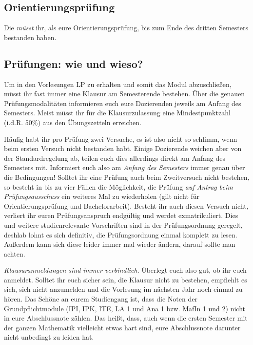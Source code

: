 \subsection{Orientierungsprüfung}

Die  \emph{müsst} ihr, als eure Orientierungsprüfung, bis zum Ende des dritten Semesters bestanden haben.


\subsection{Prüfungen: wie und wieso?}

Um in den Vorlesungen \gls{LP} zu erhalten und somit das Modul abzuschließen, müsst ihr fast immer eine Klausur am Semesterende bestehen. Über die genauen Prüfungsmodalitäten informieren euch eure Dozierenden jeweils am Anfang des Semesters. Meist müsst ihr für die Klausurzulassung eine Mindestpunktzahl (i.d.R. 50\%) aus den Übungszetteln erreichen.

Häufig habt ihr pro Prüfung zwei Versuche, es ist also nicht so schlimm, wenn beim ersten Versuch nicht bestanden habt. Einige Dozierende weichen aber von der Standardregelung ab, teilen euch dies allerdings direkt am Anfang des Semesters mit. Informiert euch also am \emph{Anfang des Semesters} immer genau über die Bedingungen! Solltet ihr eine Prüfung auch beim Zweitversuch nicht bestehen, so besteht in bis zu vier Fällen die Möglichkeit, die Prüfung \emph{auf Antrag beim Prüfungsausschuss} ein weiteres Mal zu wiederholen (gilt nicht für Orientierungsprüfung und Bachelorarbeit). Besteht ihr auch diesen Versuch nicht, verliert ihr euren Prüfungsanspruch endgültig und werdet exmatrikuliert. Dies und weitere studienrelevante Vorschriften sind in der Prüfungsordnung geregelt, deshlab lohnt es sich definitiv, die Prüfungsordnung einmal komplett zu lesen. Außerdem kann sich diese leider immer mal wieder ändern, darauf sollte man achten.

\emph{Klausuranmeldungen sind immer verbindlich}. Überlegt euch also gut, ob ihr euch anmeldet. Solltet ihr euch sicher sein, die Klausur nicht zu bestehen, empfiehlt es sich, sich nicht anzumelden und die Vorlesung im nächsten Jahr noch einmal zu hören. Das Schöne an eurem Studiengang ist, dass die Noten der Grundpflichtmodule (\gls{IPI}, \gls{IPK}, \gls{ITE}, \gls{LA} 1 und \gls{Ana} 1 bzw. \gls{MafIn} 1 und 2) nicht in eure Abschlussnote zählen. Das heißt, dass, auch wenn die ersten Semester mit der ganzen Mathematik vielleicht etwas hart sind, eure Abschlussnote darunter nicht unbedingt zu leiden hat.

